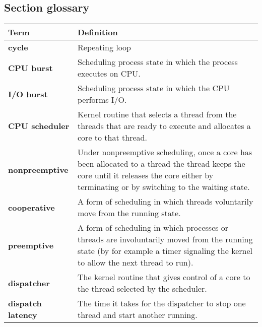 \subsection*{Section glossary}
\centering
\begin{tabular}{>{\raggedright}p{} >{\raggedright\arraybackslash}p{}}
\toprule
\textbf{Term} & \textbf{Definition} \\
\midrule
\textbf{cycle} & Repeating loop \\
\textbf{CPU burst} & Scheduling process state in which the process executes on CPU. \\
\textbf{I/O burst} & Scheduling process state in which the CPU performs I/O. \\
\textbf{CPU scheduler} & Kernel routine that selects a thread from the threads that are ready to execute and allocates a core to that thread. \\
\textbf{nonpreemptive} & Under nonpreemptive scheduling, once a core has been allocated to a thread the thread keeps the core until it releases the core either by terminating or by switching to the waiting state. \\
\textbf{cooperative} & A form of scheduling in which threads voluntarily move from the running state. \\
\textbf{preemptive} & A form of scheduling in which processes or threads are involuntarily moved from the running state (by for example a timer signaling the kernel to allow the next thread to run). \\
\textbf{dispatcher} & The kernel routine that gives control of a core to the thread selected by the scheduler. \\
\textbf{dispatch latency} & The time it takes for the dispatcher to stop one thread and start another running. \\
\bottomrule
\end{tabular}
\vspace{\baselineskip}
